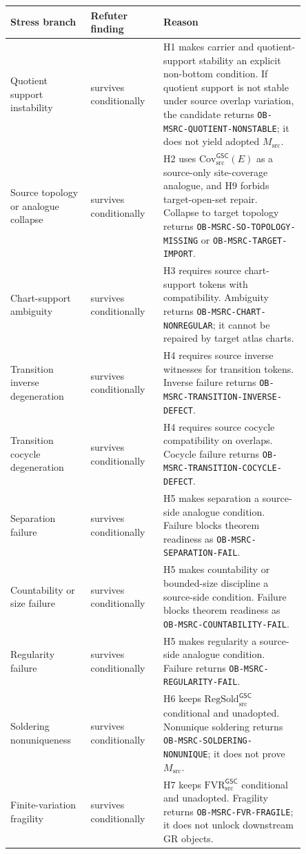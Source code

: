 \documentclass[11pt]{article}
\newcommand{\Msrc}{M_{\mathrm{src}}}
\newcommand{\RegSold}{\mathrm{RegSold}_{\mathrm{src}}^{\mathsf{GSC}}}
\newcommand{\FVR}{\mathrm{FVR}_{\mathrm{src}}^{\mathsf{GSC}}}
\newcommand{\CovSrc}{\mathrm{Cov}_{\mathrm{src}}^{\mathsf{GSC}}}
\begin{document}
\begin{longtable}{p{0.23\linewidth}p{0.20\linewidth}p{0.42\linewidth}}
\toprule
Stress branch & Refuter finding & Reason \\
\midrule
Quotient support instability &
survives conditionally &
H1 makes carrier and quotient-support stability an explicit non-bottom
condition. If quotient support is not stable under source overlap variation,
the candidate returns \texttt{OB-MSRC-QUOTIENT-NONSTABLE}; it does not yield
adopted \(\Msrc\). \\
Source topology or analogue collapse &
survives conditionally &
H2 uses \(\CovSrc(E)\) as a source-only site-coverage analogue, and H9 forbids
target-open-set repair. Collapse to target topology returns
\texttt{OB-MSRC-SO-TOPOLOGY-MISSING} or
\texttt{OB-MSRC-TARGET-IMPORT}. \\
Chart-support ambiguity &
survives conditionally &
H3 requires source chart-support tokens with compatibility. Ambiguity returns
\texttt{OB-MSRC-CHART-NONREGULAR}; it cannot be repaired by target atlas
charts. \\
Transition inverse degeneration &
survives conditionally &
H4 requires source inverse witnesses for transition tokens. Inverse failure
returns \texttt{OB-MSRC-TRANSITION-INVERSE-DEFECT}. \\
Transition cocycle degeneration &
survives conditionally &
H4 requires source cocycle compatibility on overlaps. Cocycle failure returns
\texttt{OB-MSRC-TRANSITION-COCYCLE-DEFECT}. \\
Separation failure &
survives conditionally &
H5 makes separation a source-side analogue condition. Failure blocks theorem
readiness as \texttt{OB-MSRC-SEPARATION-FAIL}. \\
Countability or size failure &
survives conditionally &
H5 makes countability or bounded-size discipline a source-side condition.
Failure blocks theorem readiness as \texttt{OB-MSRC-COUNTABILITY-FAIL}. \\
Regularity failure &
survives conditionally &
H5 makes regularity a source-side analogue condition. Failure returns
\texttt{OB-MSRC-REGULARITY-FAIL}. \\
Soldering nonuniqueness &
survives conditionally &
H6 keeps \(\RegSold\) conditional and unadopted. Nonunique soldering returns
\texttt{OB-MSRC-SOLDERING-NONUNIQUE}; it does not prove \(\Msrc\). \\
Finite-variation fragility &
survives conditionally &
H7 keeps \(\FVR\) conditional and unadopted. Fragility returns
\texttt{OB-MSRC-FVR-FRAGILE}; it does not unlock downstream GR objects. \\

\end{longtable}
\end{document}

